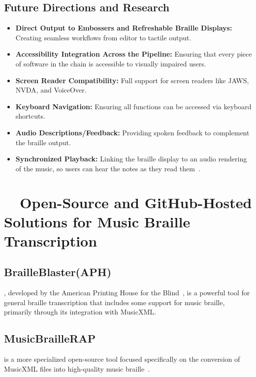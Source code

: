 \subsection{Future Directions and Research}\label{ch10:ssec:bmml-future-directions}
\begin{itemize}
	\item \textbf{Direct Output to Embossers and Refreshable Braille Displays:} Creating seamless workflows from editor to tactile output.
	\item \textbf{Accessibility Integration Across the Pipeline:} Ensuring that every piece of software in the chain is accessible to visually impaired users.
	\item \textbf{Screen Reader Compatibility:} Full support for screen readers like JAWS, NVDA, and VoiceOver.
	\item \textbf{Keyboard Navigation:} Ensuring all functions can be accessed via keyboard shortcuts.
	\item \textbf{Audio Descriptions/Feedback:} Providing spoken feedback to complement the braille output.
	\item \textbf{Synchronized Playback:} Linking the braille display to an audio rendering of the music, so users can hear the notes as they read them~\supercite{canasstech-limealoud}.
\end{itemize}

\section{~~Open-Source and GitHub-Hosted Solutions for Music Braille Transcription}\label{ch10:sec:open-source-solutions}

\subsection{BrailleBlaster(APH)}\label{ch10:ssec:brailleblaster}
, developed by the American Printing House for the Blind~\supercite{aph-brailleblaster}, is a powerful tool for general braille transcription that includes some support for music braille, primarily through its integration with \gls{MusicXML}.

\subsection{MusicBrailleRAP}\label{ch10:ssec:musicbraillerap}
 is a more specialized open-source tool focused specifically on the conversion of \gls{MusicXML} files into high-quality music braille~\supercite{musicbraillerap-github}.

